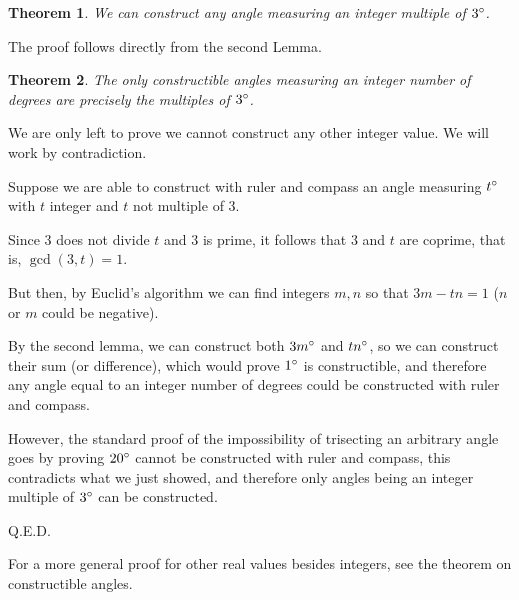 \documentclass[12pt]{article}
\newtheorem{thm}{Theorem}
\begin{document}
\begin{thm}
We can construct any angle measuring an integer multiple of $3\sp\circ$.
\end{thm}

The proof follows directly from the second Lemma.

\begin{thm}
The only constructible angles measuring an integer number of degrees are precisely the multiples of $3\sp\circ$.
\end{thm}

We are only left to prove we cannot construct any other integer value. We will work by contradiction.

Suppose we are able to construct with ruler and compass an angle measuring $t\sp\circ$ with $t$ integer and $t$ not multiple of $3$.

Since $3$ does not divide $t$ and $3$ is prime, it follows that $3$ and $t$ are coprime, that is, $ \gcd(3,t)=1$.

But then, by Euclid's algorithm we can find integers $m,n$ so that
$3m-tn=1$ ($n$ or $m$ could be negative).

By the second lemma, we can construct both $3m\sp\circ$ and $tn\sp\circ$, so we can construct their sum (or difference), which would prove $1\sp\circ$ is constructible, and therefore any angle equal to an integer number of degrees could be constructed with ruler and compass.

However, the standard proof of the impossibility of trisecting an arbitrary angle goes by proving $20\sp\circ$ cannot be constructed with ruler and compass, this contradicts what we just showed, and therefore only angles being an integer multiple of $3\sp\circ$ can be constructed.

Q.E.D.

For a more general proof for other real values besides integers, see the theorem on constructible angles.
\end{document}
